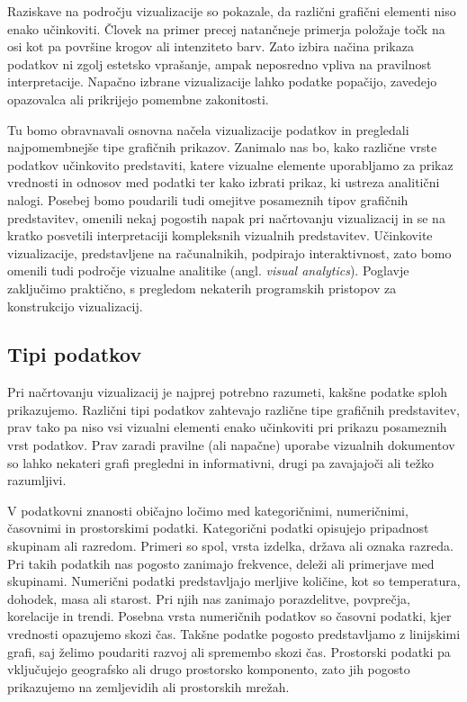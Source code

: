 Raziskave na področju vizualizacije so pokazale, da različni grafični elementi niso enako učinkoviti. Človek na primer precej natančneje primerja položaje točk na osi kot pa površine krogov ali intenziteto barv. Zato izbira načina prikaza podatkov ni zgolj estetsko vprašanje, ampak neposredno vpliva na pravilnost interpretacije. Napačno izbrane vizualizacije lahko podatke popačijo, zavedejo opazovalca ali prikrijejo pomembne zakonitosti.

Tu bomo obravnavali osnovna načela vizualizacije podatkov in pregledali najpomembnejše tipe grafičnih prikazov. Zanimalo nas bo, kako različne vrste podatkov učinkovito predstaviti, katere vizualne elemente uporabljamo za prikaz vrednosti in odnosov med podatki ter kako izbrati prikaz, ki ustreza analitični nalogi. Posebej bomo poudarili tudi omejitve posameznih tipov grafičnih predstavitev, omenili nekaj pogostih napak pri načrtovanju vizualizacij in se na kratko posvetili interpretaciji kompleksnih vizualnih predstavitev. Učinkovite vizualizacije, predstavljene na računalnikih, podpirajo interaktivnost, zato bomo omenili tudi področje vizualne analitike (angl. \emph{visual analytics}). Poglavje zaključimo praktično, s pregledom nekaterih programskih pristopov za konstrukcijo vizualizacij.


\subsection{Tipi podatkov}

Pri načrtovanju vizualizacij je najprej potrebno razumeti, kakšne podatke sploh prikazujemo. Različni tipi podatkov zahtevajo različne tipe grafičnih predstavitev, prav tako pa niso vsi vizualni elementi enako učinkoviti pri prikazu posameznih vrst podatkov. Prav zaradi pravilne (ali napačne) uporabe vizualnih dokumentov so lahko nekateri grafi pregledni in informativni, drugi pa zavajajoči ali težko razumljivi.

V podatkovni znanosti običajno ločimo med kategoričnimi, numeričnimi, časovnimi in prostorskimi podatki. Kategorični podatki opisujejo pripadnost skupinam ali razredom. Primeri so spol, vrsta izdelka, država ali oznaka razreda. Pri takih podatkih nas pogosto zanimajo frekvence, deleži ali primerjave med skupinami. Numerični podatki predstavljajo merljive količine, kot so temperatura, dohodek, masa ali starost. Pri njih nas zanimajo porazdelitve, povprečja, korelacije in trendi. Posebna vrsta numeričnih podatkov so časovni podatki, kjer vrednosti opazujemo skozi čas. Takšne podatke pogosto predstavljamo z linijskimi grafi, saj želimo poudariti razvoj ali spremembo skozi čas. Prostorski podatki pa vključujejo geografsko ali drugo prostorsko komponento, zato jih pogosto prikazujemo na zemljevidih ali prostorskih mrežah.

